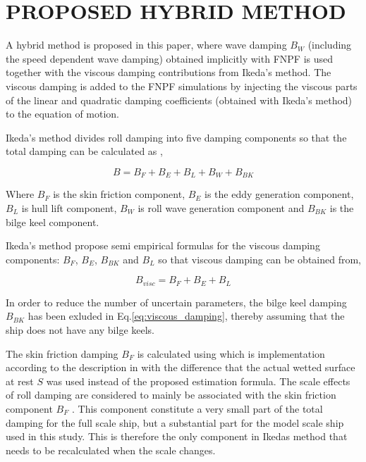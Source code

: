 \section*{PROPOSED HYBRID METHOD}\label{proposed-hybrid-method}

A hybrid method is proposed in this paper, where wave damping $B_W$
(including the speed dependent wave damping) obtained implicitly with
FNPF is used together with the viscous damping contributions from
Ikeda's method. The viscous damping is added to the FNPF simulations by
injecting the viscous parts of the linear and quadratic damping
coefficients (obtained with Ikeda's method) to the equation of motion.

\quad Ikeda's method divides roll damping into five damping components
so that the total damping can be calculated as \citep{7505983/937PN5DT},

\begin{equation}
B = B_F + B_E + B_L + B_W + B_{BK}
\end{equation}

Where $B_F$ is the skin friction component, $B_E$ is the eddy
generation component, $B_L$ is hull lift component, $B_W$ is roll
wave generation component and $B_{BK}$ is the bilge keel component.

\quad Ikeda's method propose semi empirical formulas for the viscous
damping components: $B_F$, $B_E$, $B_{BK}$ and $B_L$ so that
viscous damping can be obtained from,

\begin{equation}
\label{eq:viscous_damping}
B_{visc} = B_F + B_E + B_L
\end{equation}

\quad In order to reduce the number of uncertain parameters, the bilge
keel damping $B_{BK}$ has been exluded in
Eq.\ref{eq:viscous_damping}, thereby assuming that the ship does
not have any bilge keels.

\quad The skin friction damping $B_F$ is calculated using
\citep{7505983/CKCMI3N9} which is implementation according to the
description in \citep{7505983/UGK6YEVD} with the difference that the
actual wetted surface at rest $S$ was used instead of the proposed
estimation formula. The scale effects of roll damping are considered to
mainly be associated with the skin friction component $B_F$
\citep{7505983/FB64RGPF}. This component constitute a very small part of
the total damping for the full scale ship, but a substantial part for
the model scale ship used in this study. This is therefore the only
component in Ikedas method that needs to be recalculated when the scale
changes.

